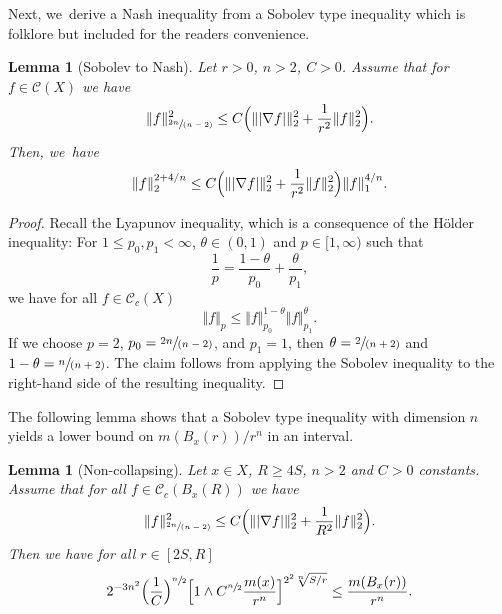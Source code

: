 \documentclass[JEP,XML,SOM,Unicode,published]{cedram}
\newcommand{\spfrac}[2]{\sfrac{#1}{(#2)}}
\theoremstyle{plain}
\newtheorem{lemma}[theorem]{Lemma}
\theoremstyle{definition}
\newcommand{\cC}{\mathcal{C}}
\begin{document}
Next, we~derive a Nash inequality from a Sobolev type inequality which is folklore {but} included for the readers convenience.

\begin{lemma}[Sobolev to Nash]\label{lem:StoN}
Let $r>0$, $n>2$, {$ C>0 $}. Assume that for $f\in \cC({X})$ we have
\[
\Vert f\Vert_{\spfrac{2n}{n-2}}^2\leq C\Bigl(\Vert |\nabla f|\Vert_2^2+\frac{1}{r^2}\Vert f\Vert_2^2\Bigr).
\]
Then, we~have
\[
\Vert f\Vert_2^{2+4/n}\leq C \Bigl(\Vert |\nabla f|\Vert_2^2+\frac{1}{r^2}\Vert f\Vert_2^2\Bigr)\Vert f\Vert_1^{4/n}.
\]
\end{lemma}

\begin{proof}
Recall the Lyapunov inequality, which is a consequence of the Hölder inequality: For $1\leq p_0,p_1<\infty$, $\theta\in(0,1)$ and $p\in [1,\infty)$ such that
\[
\frac{1}{p}=\frac{1-\theta}{p_0}+\frac{\theta}{p_1},
\]
we have for all $f\in\cC_c(X)$
\[
\Vert f\Vert_p\leq \Vert f\Vert_{p_0}^{1-\theta}\Vert f\Vert_{p_1}^\theta.
\]
If we choose $p=2$, $p_0=\spfrac{2n}{n-2}$, and $p_1=1$, then $\theta=\spfrac{2}{n+2}$ and $1-\theta=\spfrac{n}{n+2}$. The claim follows from applying the Sobolev inequality to the right-hand side of the resulting inequality.
\end{proof}

The following lemma shows that a Sobolev type inequality with dimension $ n $ yields a lower bound on $ m(B_{x}(r))/r^n $ in an interval.

\begin{lemma}[Non-collapsing]\label{lem:asnoncoll}Let $x\in X$, $R {\ge 4S}$,
$n>2$ and $C>0$ constants. Assume that for all $f\in \cC_{c}(B_x(R))$ we have
\[
\Vert f\Vert_{\spfrac{2n}{n-2}}^2\leq C\Bigl(\Vert| \nabla f|\Vert_2^2+\frac{1}{R^2}\Vert f\Vert_2^2\Bigr).
\]
Then we have for all $r\in[2S,R]$
\[
2^{-{3}n^2}\Bigl(\frac{1}{C}\Bigr)^{\sfrac{n}{2}}
\Bigl[1\wedge C^{\sfrac{n}{2}}\frac{m(x)}{r^{n}}\Bigr]^{2^{2}\sqrt[n]{{S}/{r}}}
\leq \frac{m(B_x(r))}{r^{n}}.
\]
\end{lemma}
\end{document}
